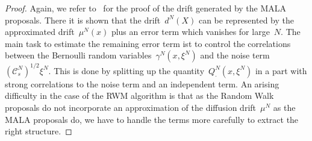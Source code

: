 \begin{proof} 
 Again, we refer to~\autocite[Lemma 4.7]{Pillai2012} for the proof of the drift generated by the MALA proposals. There it is shown that the drift~$d^N(X)$ can be represented by the approximated drift~$\mu^N(x)$ plus an error term which vanishes for large~$N$. The main task to estimate the remaining error term ist to control the correlations between the Bernoulli random variables~$\gamma^N(x, \xi^N)$ and the noise term~$ (\mathcal{C}_s^N)^{1/2} \xi^N$. This is done by splitting up the quantity~$Q^N_{\cdot}(x, \xi^N)$ in a part with strong correlations to the noise term and an independent term.  An arising difficulty in the case of the RWM algorithm is that as the Random Walk proposals do not incorporate an approximation of the diffusion drift~$\mu^N$ as the MALA proposals do, we have to handle the terms more carefully to extract the right structure. 
 

\end{proof}
